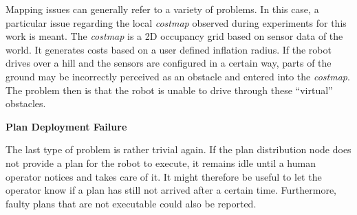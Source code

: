 \documentclass[english, master, utf8]{base/thesis_KBS}
\begin{document}
\noindent
Mapping issues can generally refer to a variety of problems. In this case, a particular issue regarding the local \textit{costmap} observed during experiments for this work is meant.
The \textit{costmap} is a 2D occupancy grid based on sensor data of the world. It generates costs based on a user defined inflation radius.
If the robot drives over a hill and the sensors are configured in a certain way, parts of the ground may be incorrectly perceived as an obstacle and entered into the \textit{costmap}.
The problem then is that the robot is unable to drive through these ``virtual'' obstacles. \newline

\noindent
\textbf{Plan Deployment Failure}\newline

\noindent
The last type of problem is rather trivial again. If the plan distribution node does not provide a plan for the robot to execute, it remains idle until a human operator 
notices and takes care of it. It might therefore be useful to let the operator know if a plan has still not arrived after a certain time.
Furthermore, faulty plans that are not executable could also be reported.\newline
\end{document}
